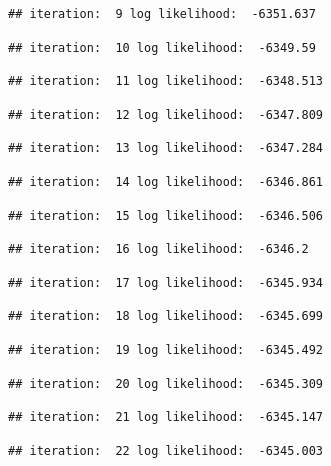 \documentclass[
]{article}
\begin{document}
\begin{verbatim}
## iteration:  9 log likelihood:  -6351.637
\end{verbatim}

\begin{verbatim}
## iteration:  10 log likelihood:  -6349.59
\end{verbatim}

\begin{verbatim}
## iteration:  11 log likelihood:  -6348.513
\end{verbatim}

\begin{verbatim}
## iteration:  12 log likelihood:  -6347.809
\end{verbatim}

\begin{verbatim}
## iteration:  13 log likelihood:  -6347.284
\end{verbatim}

\begin{verbatim}
## iteration:  14 log likelihood:  -6346.861
\end{verbatim}

\begin{verbatim}
## iteration:  15 log likelihood:  -6346.506
\end{verbatim}

\begin{verbatim}
## iteration:  16 log likelihood:  -6346.2
\end{verbatim}

\begin{verbatim}
## iteration:  17 log likelihood:  -6345.934
\end{verbatim}

\begin{verbatim}
## iteration:  18 log likelihood:  -6345.699
\end{verbatim}

\begin{verbatim}
## iteration:  19 log likelihood:  -6345.492
\end{verbatim}

\begin{verbatim}
## iteration:  20 log likelihood:  -6345.309
\end{verbatim}

\begin{verbatim}
## iteration:  21 log likelihood:  -6345.147
\end{verbatim}

\begin{verbatim}
## iteration:  22 log likelihood:  -6345.003
\end{verbatim}
\end{document}
